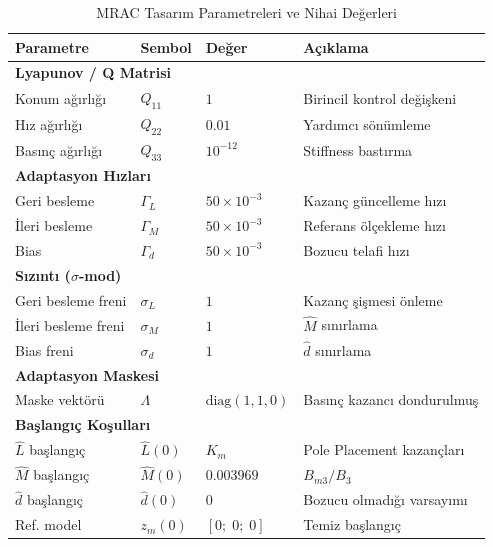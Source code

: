\documentclass[12pt,a4paper]{article}
\begin{document}
\begin{table}[H]
\centering
\caption{MRAC Tasarım Parametreleri ve Nihai Değerleri}
\label{tab:params}
\begin{tabular}{llll}
\toprule
\textbf{Parametre} & \textbf{Sembol} & \textbf{Değer} & \textbf{Açıklama} \\
\midrule
\multicolumn{4}{l}{\textbf{Lyapunov / Q Matrisi}} \\
\midrule
Konum ağırlığı & $Q_{11}$ & $1$ & Birincil kontrol değişkeni \\
Hız ağırlığı & $Q_{22}$ & $0.01$ & Yardımcı sönümleme \\
Basınç ağırlığı & $Q_{33}$ & $10^{-12}$ & Stiffness bastırma \\
\midrule
\multicolumn{4}{l}{\textbf{Adaptasyon Hızları}} \\
\midrule
Geri besleme & $\Gamma_L$ & $50 \times 10^{-3}$ & Kazanç güncelleme hızı \\
İleri besleme & $\Gamma_M$ & $50 \times 10^{-3}$ & Referans ölçekleme hızı \\
Bias & $\Gamma_d$ & $50 \times 10^{-3}$ & Bozucu telafi hızı \\
\midrule
\multicolumn{4}{l}{\textbf{Sızıntı ($\sigma$-mod)}} \\
\midrule
Geri besleme freni & $\sigma_L$ & $1$ & Kazanç şişmesi önleme \\
İleri besleme freni & $\sigma_M$ & $1$ & $\hat{M}$ sınırlama \\
Bias freni & $\sigma_d$ & $1$ & $\hat{d}$ sınırlama \\
\midrule
\multicolumn{4}{l}{\textbf{Adaptasyon Maskesi}} \\
\midrule
Maske vektörü & $\Lambda$ & $\text{diag}(1,1,0)$ & Basınç kazancı dondurulmuş \\
\midrule
\multicolumn{4}{l}{\textbf{Başlangıç Koşulları}} \\
\midrule
$\hat{L}$ başlangıç & $\hat{L}(0)$ & $K_m$ & Pole Placement kazançları \\
$\hat{M}$ başlangıç & $\hat{M}(0)$ & $0.003969$ & $B_{m3}/B_3$ \\
$\hat{d}$ başlangıç & $\hat{d}(0)$ & $0$ & Bozucu olmadığı varsayımı \\
Ref. model & $z_m(0)$ & $[0;\;0;\;0]$ & Temiz başlangıç \\
\bottomrule
\end{tabular}
\end{table}

\end{document}
